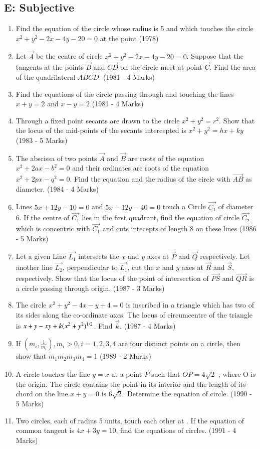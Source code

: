\documentclass[journal,12pt,twocolumn]{IEEEtran}
\theoremstyle{remark}
\begin{document}
\subsection*{E: Subjective}
\begin{enumerate}
\item Find the equation of the circle whose radius is 5 and which touches the circle $x^2+y^2-2x-4y-20=0$ at the point 
\hfill{(1978)}
\item Let $\vec{A}$ be the centre of circle $x^2+y^2-2x-4y-20=0$. Suppose that the tangents at the points $\vec{B}$ and $\vec{CD}$  on the circle meet at point $\vec{C}$. Find the area of the quadrilateral $ABCD$.
\hfill{(1981 - 4 Marks)}
\item Find the equations of the circle passing through  and touching the lines $x+y=2$ and $x-y=2$
\hfill{(1981 - 4 Marks)}
\item Through a fixed point  secants are drawn to the circle $x^2+y^2=r^2$. Show that the locus of the mid-points of the secants intercepted is $x^2+y^2=hx+ky$
\hfill{(1983 - 5 Marks)}
\item The abscissa of two points $\vec{A}$ and $\vec{B}$ are roots of the equation $x^2+2ax-b^2=0$ and their ordinates are roots of the equation $x^2+2px-q^2=0$. Find the equation and the radius of the circle with $\vec{AB}$ as diameter.
\hfill{(1984 - 4 Marks)}
\item Lines $5x+12y-10=0$ and $5x-12y-40=0$ touch a Circle $\vec{C_1}$ of diameter 6. If the centre of $\vec{C_1}$ lies in the first quadrant, find the equation of circle $\vec{C_2}$ which is concentric with $\vec{C_1}$ and cuts intecepts of length 8 on these lines
\hfill{(1986 - 5 Marks)}
\item Let a given Line $\vec{L_1}$ intersects the $x$ and $y$ axes at $\vec{P}$ and $\vec{Q}$ respectively. Let another line $\vec{L_2}$, perpendicular to $\vec{L_1}$, cut the $x$ and $y$ axes at $\vec{R}$ and $\vec{S}$, respectively. Show that the locus of the point of intersection of $\vec{PS}$ and $\vec{QR}$ is a circle passing through origin.
\hfill{(1987 - 3 Marks)}
\item The circle $x^2+y^2-4x-y+4=0$ is inscribed in a triangle which has two of its sides along the co-ordinate axes. The locus of circumcentre of the triangle is $x+y-xy+k(x^2+y^2)\textsuperscript{1/2}$. Find $\vec{k}$.
\hfill{(1987 - 4 Marks)}
\item If $\left( m_i, \frac{1}{m_i} \right), m_i > 0, i = 1, 2, 3, 4$ are four distinct points on a circle, then show that $m_1m_2m_3m_4=1$
\hfill{(1989 - 2 Marks)}
\item A circle touches the line $y=x$ at a point $\vec{P}$ such that $OP=4\sqrt{2}$ , where O is the origin. The circle contains the point  in its interior and the length of its chord on the line $x+y=0$ is $6\sqrt{2}$. Determine the equation of circle.
\hfill{(1990 - 5 Marks)}
\item Two circles, each of radius 5 units, touch each other at . If the equation of common tangent is $4x+3y=10$, find the equations of circles.
\hfill{(1991 - 4 Marks)}
\end{enumerate}
\end{document}
